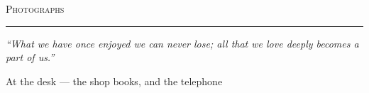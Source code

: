 
\label{toc:photographs}



\vspace*{\fill}

\begin{center}
  {\Large\scshape\color{primary} Photographs}

  \vspace{3mm}
  {\color{rulecolor}\rule{18mm}{0.4pt}}

  \vspace{4mm}
  \begin{minipage}{0.82\linewidth}
    \centering\small\itshape\color{accent}
    ``What we have once enjoyed we can never lose; all that we love deeply
    becomes a part of us.''
  \end{minipage}
\end{center}

\vspace*{6mm}

\newpage

%
\vspace*{2mm}

{\centering
    {At the desk --- the shop books, and the telephone}\par}

\vspace{6mm}

{\centering
  \begin{minipage}[t]{0.43\linewidth}
    \centering
  \end{minipage}%
  \hspace{0.04\linewidth}%
  \begin{minipage}[t]{0.42\linewidth}
    \centering
  \end{minipage}\par}

\vfill
